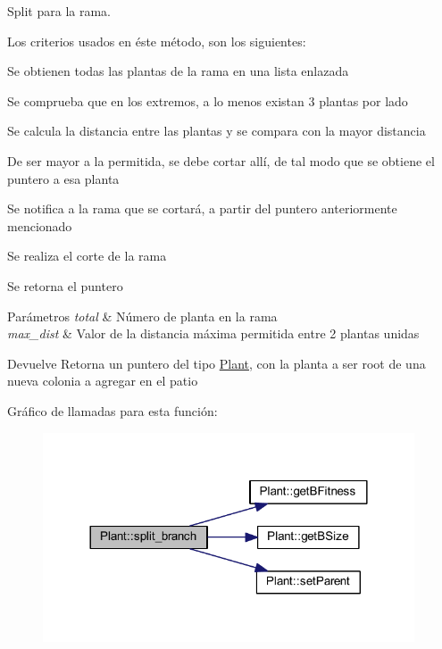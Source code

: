 Split para la rama. 

Los criterios usados en éste método, son los siguientes\+:
\begin{DoxyItemize}
\item Se obtienen todas las plantas de la rama en una lista enlazada
\item Se comprueba que en los extremos, a lo menos existan 3 plantas por lado
\item Se calcula la distancia entre las plantas y se compara con la mayor distancia
\item De ser mayor a la permitida, se debe cortar allí, de tal modo que se obtiene el puntero a esa planta
\item Se notifica a la rama que se cortará, a partir del puntero anteriormente mencionado
\item Se realiza el corte de la rama
\item Se retorna el puntero
\end{DoxyItemize}


\begin{DoxyParams}{Parámetros}
{\em total} & Número de planta en la rama \\
\hline
{\em max\+\_\+dist} & Valor de la distancia máxima permitida entre 2 plantas unidas\\
\hline
\end{DoxyParams}
\begin{DoxyReturn}{Devuelve}
Retorna un puntero del tipo \hyperlink{class_plant}{Plant}, con la planta a ser root de una nueva colonia a agregar en el patio 
\end{DoxyReturn}


Gráfico de llamadas para esta función\+:
\nopagebreak
\begin{figure}[H]
\begin{center}
\leavevmode
\includegraphics[width=312pt]{class_plant_ab7c3c50790efd2843219e439cdf7e687_cgraph}
\end{center}
\end{figure}




